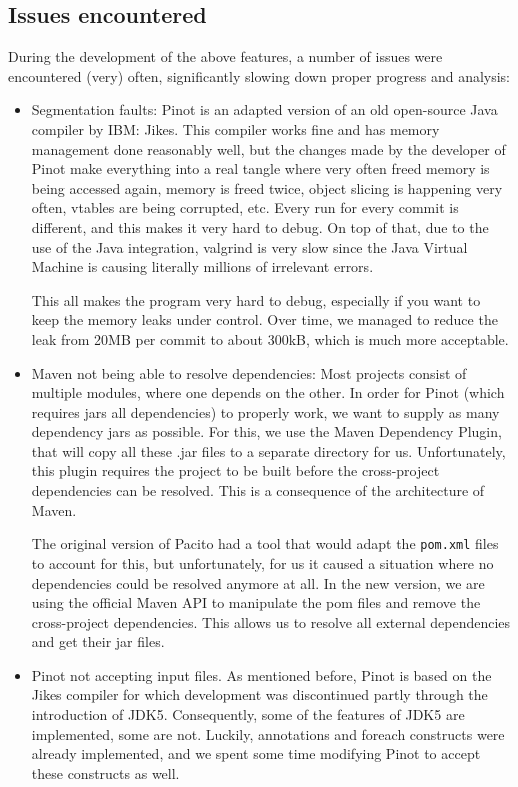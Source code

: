 \subsection{Issues encountered}
During the development of the above features, a number of issues were encountered (very) often, significantly slowing down proper progress and analysis:
\begin{itemize}
    \item Segmentation faults: Pinot is an adapted version of an old open-source Java compiler by IBM: Jikes. This compiler works fine and has memory management done reasonably well, but the changes made by the developer of Pinot make everything into a real tangle where very often freed memory is being accessed again, memory is freed twice, object slicing is happening very often, vtables are being corrupted, etc. Every run for every commit is different, and this makes it very hard to debug. On top of that, due to the use of the Java integration, valgrind is very slow since the Java Virtual Machine is causing literally millions of irrelevant errors.
    
    This all makes the program very hard to debug, especially if you want to keep the memory leaks under control. Over time, we managed to reduce the leak from 20MB per commit to about 300kB, which is much more acceptable.
    
    \item Maven not being able to resolve dependencies: Most projects consist of multiple modules, where one depends on the other. In order for Pinot (which requires jars all dependencies) to properly work, we want to supply as many dependency jars as possible. For this, we use the Maven Dependency Plugin, that will copy all these .jar files to a separate directory for us. Unfortunately, this plugin requires the project to be built before the cross-project dependencies can be resolved. This is a consequence of the architecture of Maven.
    
    The original version of Pacito had a tool that would adapt the {\tt pom.xml} files to account for this, but unfortunately, for us it caused a situation where no dependencies could be resolved anymore at all. In the new version, we are using the official Maven API to manipulate the pom files and remove the cross-project dependencies. This allows us to resolve all external dependencies and get their jar files.
    
    \item Pinot not accepting input files. As mentioned before, Pinot is based on the Jikes compiler for which development was discontinued partly through the introduction of JDK5. Consequently, some of the features of JDK5 are implemented, some are not. Luckily, annotations and foreach constructs were already implemented, and we spent some time modifying Pinot to accept these constructs as well.
    

\end{itemize}

